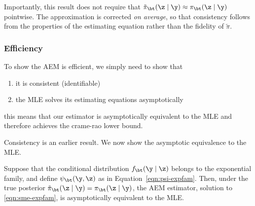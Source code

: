 \noindent
Importantly, this result does not require that \( \tilde{\pi}_\bt(\z \mid \y) \approx \pi_\bt(\z \mid \y) \) pointwise. The approximation is corrected \emph{on average}, so that consistency follows from the properties of the estimating equation rather than the fidelity of \( \tilde{\pi} \).

\subsubsection{Efficiency}
To show the AEM is efficient, we simply need to show that
\begin{enumerate}
\item it is consistent (identifiable)
\item the MLE solves its estimating equations asymptotically
\end{enumerate}
this means that our estimator is asymptotically equivalent to the MLE and therefore achieves the crame-rao lower bound.

Consistency is an earlier result. We now show the asymptotic equivalence to the MLE.
\begin{lemma}
\label{lemma:equivalence-true-posterior}
Suppose that the conditional distribution \( f_\bt(\y \mid \z) \) belongs to the exponential family, and define \( \psi_\bt(\y, \z) \) as in Equation~\eqref{eqn:psi-expfam}. Then, under the true posterior \( \tilde \pi_\bt(\z \mid \y) = \pi_\bt(\z \mid \y) \), the AEM estimator, solution to \eqref{eqn:sme-expfam}, is asymptotically equivalent to the MLE.
\end{lemma}

